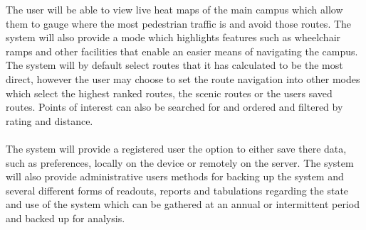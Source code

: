 \documentclass{article}
\begin{document}
{            	The user will be able to view live heat maps of the main campus which allow them to gauge where the most pedestrian traffic is and avoid those routes. The system will also provide a mode which highlights features such as wheelchair ramps and other facilities that enable an easier means of navigating the campus. The system will by default select routes that it has calculated to be the most direct, however the user may choose to set the route navigation into other modes which select the highest ranked routes, the scenic routes or the users saved routes. Points of interest can also be searched for and ordered and filtered by rating and distance.\\\\
            	The system will provide a registered user the option to either save there data, such as preferences, locally on the device or remotely on the server. The system will also provide administrative users methods for backing up the system and several different forms of readouts, reports and tabulations regarding the state and use of the system which can be gathered at an annual or intermittent period and backed up for analysis.}
           
        
\end{document}
